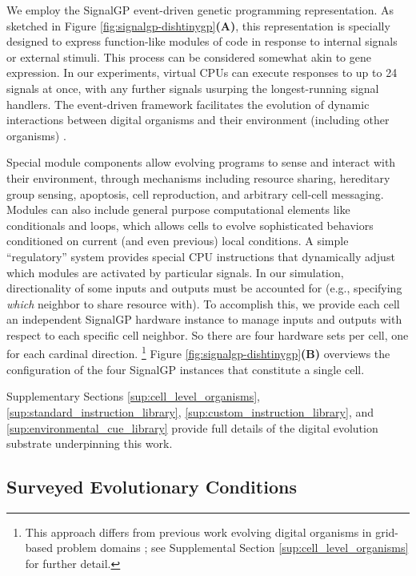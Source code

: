 We employ the SignalGP event-driven genetic programming representation.
As sketched in Figure \ref{fig:signalgp-dishtinygp}\textbf{(A)}, this representation is specially designed to express function-like modules of code in response to internal signals or external stimuli.
This process can be considered somewhat akin to gene expression.
In our experiments, virtual CPUs can execute responses to up to 24 signals at once, with any further signals usurping the longest-running signal handlers.
The event-driven framework facilitates the evolution of dynamic interactions between digital organisms and their environment (including other organisms) \citep{lalejini2018evolving}.

Special module components allow evolving programs to sense and interact with their environment, through mechanisms including resource sharing, hereditary group sensing, apoptosis, cell reproduction, and arbitrary cell-cell messaging.
Modules can also include general purpose computational elements like conditionals and loops, which allows cells to evolve sophisticated behaviors conditioned on current (and even previous) local conditions.
A simple ``regulatory'' system provides special CPU instructions that dynamically adjust which modules are activated by particular signals.
In our simulation, directionality of some inputs and outputs must be accounted for (e.g., specifying \textit{which} neighbor to share resource with).
To accomplish this, we provide each cell an independent SignalGP hardware instance to manage inputs and outputs with respect to each specific cell neighbor.
So there are four hardware sets per cell, one for each cardinal direction.
\footnote{
This approach differs from previous work evolving digital organisms in grid-based problem domains \citep{goldsby2014evolutionary, goldsby2018serendipitous, grabowski2010early, biswas2014causes, lalejini2018evolving}; see Supplemental Section \ref{sup:cell_level_organisms} for further detail.
}
Figure \ref{fig:signalgp-dishtinygp}\textbf{(B)} overviews the configuration of the four SignalGP instances that constitute a single cell.

Supplementary Sections \ref{sup:cell_level_organisms}, \ref{sup:standard_instruction_library}, \ref{sup:custom_instruction_library}, and \ref{sup:environmental_cue_library} provide full details of the digital evolution substrate underpinning this work.

\subsection{Surveyed Evolutionary Conditions}

